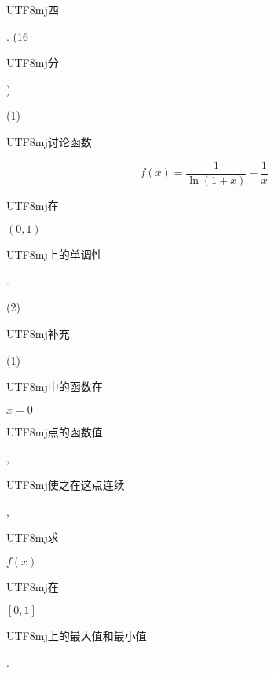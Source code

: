 \documentclass[10pt]{article}
\begin{document}
\begin{CJK}{UTF8}{mj}四\end{CJK}. (16 \begin{CJK}{UTF8}{mj}分\end{CJK})

(1) \begin{CJK}{UTF8}{mj}讨论函数\end{CJK}
$$
f(x)=\frac{1}{\ln (1+x)}-\frac{1}{x}
$$
\begin{CJK}{UTF8}{mj}在\end{CJK} $(0,1)$ \begin{CJK}{UTF8}{mj}上的单调性\end{CJK}.

(2) \begin{CJK}{UTF8}{mj}补充\end{CJK} (1) \begin{CJK}{UTF8}{mj}中的函数在\end{CJK} $x=0$ \begin{CJK}{UTF8}{mj}点的函数值\end{CJK}, \begin{CJK}{UTF8}{mj}使之在这点连续\end{CJK}, \begin{CJK}{UTF8}{mj}求\end{CJK} $f(x)$ \begin{CJK}{UTF8}{mj}在\end{CJK} $[0,1]$ \begin{CJK}{UTF8}{mj}上的最大值和最小值\end{CJK}.
\end{document}
